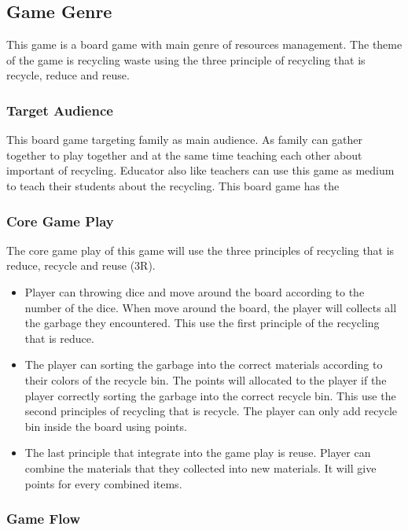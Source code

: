 \documentclass[12pt]{article}
\begin{document}
\subsection{Game Genre}
This game is a board game with main genre of resources management. The theme of the game is recycling waste using the three principle of recycling that is recycle, reduce and reuse.  

\subsubsection{Target Audience}
This board game targeting family as main audience. As family can gather together to play together and at the same time teaching each other about important of recycling. Educator also like teachers can use this game as medium to teach their students about the recycling. This board game has the 

\subsubsection{Core Game Play}
The core game play of this game will use the three principles of recycling that is reduce, recycle and reuse (3R). 
\begin{itemize}
    \item Player can throwing dice and move around the board according to the number of the dice. When move around the board, the player will collects all the garbage they encountered. This use the first principle of the recycling that is reduce.
    \item The player can sorting the garbage into the correct materials according to their colors of the recycle bin. The points will allocated to the player if the player correctly sorting the garbage into the correct recycle bin. This use the second principles of recycling that is recycle. The player can only add recycle bin inside the board using points. 
    \item The last principle that integrate into the game play is reuse. Player can combine the materials that they collected into new materials. It will give points for every combined items.
    
\end{itemize}

\subsubsection{Game Flow}
\end{document}
